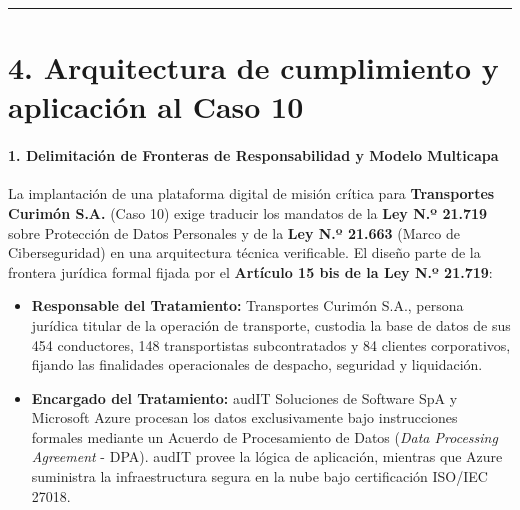 \begin{center}\rule{0.5\linewidth}{0.5pt}\end{center}

\section{4. Arquitectura de cumplimiento y aplicación al Caso 10}\label{arquitectura-de-cumplimiento-y-aplicaciuxf3n-al-caso-10}

\paragraph{1. Delimitación de Fronteras de Responsabilidad y Modelo Multicapa}\label{delimitaciuxf3n-de-fronteras-de-responsabilidad-y-modelo-multicapa}

La implantación de una plataforma digital de misión crítica para \textbf{Transportes Curimón S.A.} (Caso 10) exige traducir los mandatos de la \textbf{Ley N.º 21.719} sobre Protección de Datos Personales y de la \textbf{Ley N.º 21.663} (Marco de Ciberseguridad) en una arquitectura técnica verificable. El diseño parte de la frontera jurídica formal fijada por el \textbf{Artículo 15 bis de la Ley N.º 21.719}:

\begin{itemize}
\tightlist
\item
  \textbf{Responsable del Tratamiento:} Transportes Curimón S.A., persona jurídica titular de la operación de transporte, custodia la base de datos de sus 454 conductores, 148 transportistas subcontratados y 84 clientes corporativos, fijando las finalidades operacionales de despacho, seguridad y liquidación.
\item
  \textbf{Encargado del Tratamiento:} audIT Soluciones de Software SpA y Microsoft Azure procesan los datos exclusivamente bajo instrucciones formales mediante un Acuerdo de Procesamiento de Datos (\emph{Data Processing Agreement} - DPA). audIT provee la lógica de aplicación, mientras que Azure suministra la infraestructura segura en la nube bajo certificación ISO/IEC 27018.
\end{itemize}


